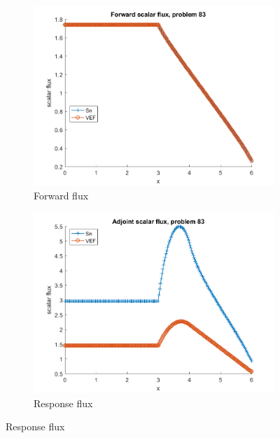 \documentclass{article}
\begin{document}
\begin{figure}[H]
\label{Case83Flux}
\centering
\begin{subfigure}{.5\textwidth}
  \centering
  \includegraphics[width=.98\linewidth]{IanProposal/figures2/83phi.png}
  \caption{Forward flux}
  \label{fig:sfig1}
\end{subfigure}%
\begin{subfigure}{.5\textwidth}
  \centering
  \includegraphics[width=.98\linewidth]{IanProposal/figures2/83phia.png}
  \caption{Response flux}
  \label{fig:sfig4}
\end{subfigure}%
\end{figure}
\end{document}

